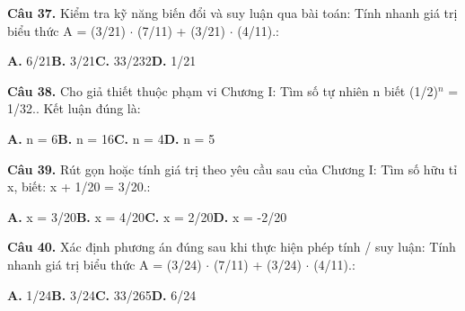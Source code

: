 \documentclass[11pt,a4paper]{article}
\begin{document}
\textbf{\color{primary} Câu 37.} Kiểm tra kỹ năng biến đổi và suy luận qua bài toán: Tính nhanh giá trị biểu thức A = (3/21) $\cdot$ (7/11) + (3/21) $\cdot$ (4/11).:\par
\hspace*{1.5em}\textbf{A.} 6/21\quad\quad \textbf{B.} 3/21\quad\quad \textbf{C.} 33/232\quad\quad \textbf{D.} 1/21\par\vspace{2pt}
\textbf{\color{primary} Câu 38.} Cho giả thiết thuộc phạm vi Chương I: Tìm số tự nhiên n biết (1/2)$^{n}$ = 1/32.. Kết luận đúng là:\par
\hspace*{1.5em}\textbf{A.} n = 6\quad\quad \textbf{B.} n = 16\quad\quad \textbf{C.} n = 4\quad\quad \textbf{D.} n = 5\par\vspace{2pt}
\textbf{\color{primary} Câu 39.} Rút gọn hoặc tính giá trị theo yêu cầu sau của Chương I: Tìm số hữu tỉ x, biết: x + 1/20 = 3/20.:\par
\hspace*{1.5em}\textbf{A.} x = 3/20\quad\quad \textbf{B.} x = 4/20\quad\quad \textbf{C.} x = 2/20\quad\quad \textbf{D.} x = -2/20\par\vspace{2pt}
\textbf{\color{primary} Câu 40.} Xác định phương án đúng sau khi thực hiện phép tính / suy luận: Tính nhanh giá trị biểu thức A = (3/24) $\cdot$ (7/11) + (3/24) $\cdot$ (4/11).:\par
\hspace*{1.5em}\textbf{A.} 1/24\quad\quad \textbf{B.} 3/24\quad\quad \textbf{C.} 33/265\quad\quad \textbf{D.} 6/24\par\vspace{2pt}
\end{document}
